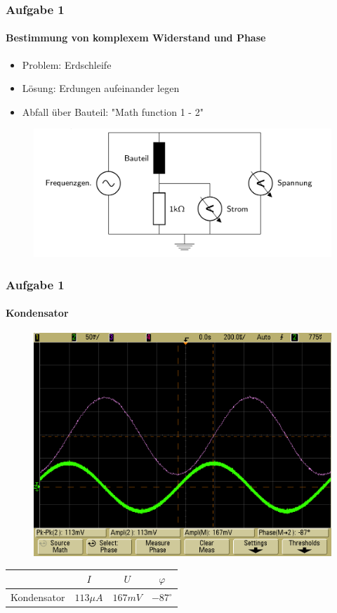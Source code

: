 \begin{frame}
\frametitle{Aufgabe 1}
\framesubtitle{Bestimmung von komplexem Widerstand und Phase}
    \begin{itemize}
        \item Problem: Erdschleife
        \item Lösung: Erdungen aufeinander legen
        \item Abfall über Bauteil: "Math function 1 - 2"
    \end{itemize}
    \begin{figure}[H]
    \begin{center}
            \includegraphics[scale=0.3]{./img/schaltbild_1_mit_erdschleife.png}
    \end{center}
    \end{figure}
\end{frame}

\begin{frame}
\frametitle{Aufgabe 1}
\framesubtitle{Kondensator}
\begin{figure}[H]
    \begin{center}
                \includegraphics[scale=0.15]{./img/1a_Kondensator_1.png}
    \end{center}
\end{figure}
\begin{center}
\begin{tabular}{c|| c | c | c}
    & $I$ & $U$ & $\varphi$ \\
    \hline
    Kondensator & $113 \mu A$ & $167mV$ & $-87^{\circ}$ \\
\end{tabular}
\end{center}
\end{frame}

